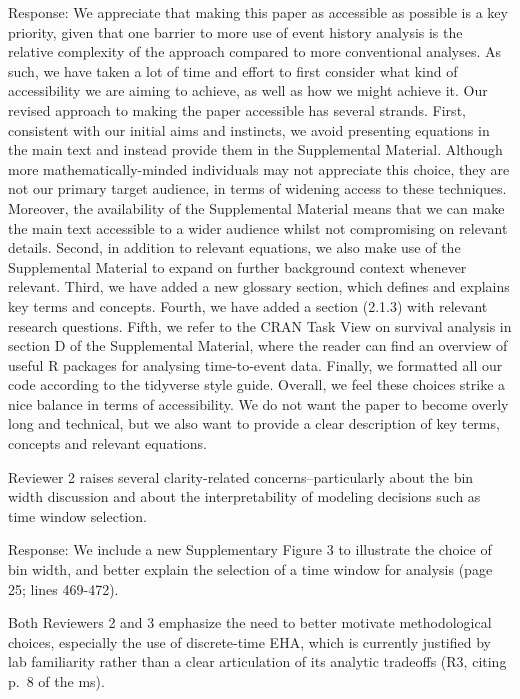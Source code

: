 \documentclass[
]{article}
\renewenvironment{quote}{\begin{leftbar}}{\end{leftbar}}
\begin{document}
Response: We appreciate that making this paper as accessible as possible
is a key priority, given that one barrier to more use of event history
analysis is the relative complexity of the approach compared to more
conventional analyses. As such, we have taken a lot of time and effort
to first consider what kind of accessibility we are aiming to achieve,
as well as how we might achieve it. Our revised approach to making the
paper accessible has several strands. First, consistent with our initial
aims and instincts, we avoid presenting equations in the main text and
instead provide them in the Supplemental Material. Although more
mathematically-minded individuals may not appreciate this choice, they
are not our primary target audience, in terms of widening access to
these techniques. Moreover, the availability of the Supplemental
Material means that we can make the main text accessible to a wider
audience whilst not compromising on relevant details. Second, in
addition to relevant equations, we also make use of the Supplemental
Material to expand on further background context whenever relevant.
Third, we have added a new glossary section, which defines and explains
key terms and concepts. Fourth, we have added a section (2.1.3) with
relevant research questions. Fifth, we refer to the CRAN Task View on
survival analysis in section D of the Supplemental Material, where the
reader can find an overview of useful R packages for analysing
time-to-event data. Finally, we formatted all our code according to the
tidyverse style guide. Overall, we feel these choices strike a nice
balance in terms of accessibility. We do not want the paper to become
overly long and technical, but we also want to provide a clear
description of key terms, concepts and relevant equations.

\begin{quote}
Reviewer 2 raises several clarity-related concerns--particularly about
the bin width discussion and about the interpretability of modeling
decisions such as time window selection.
\end{quote}

Response: We include a new Supplementary Figure 3 to illustrate the
choice of bin width, and better explain the selection of a time window
for analysis (page 25; lines 469-472).

\begin{quote}
Both Reviewers 2 and 3 emphasize the need to better motivate
methodological choices, especially the use of discrete-time EHA, which
is currently justified by lab familiarity rather than a clear
articulation of its analytic tradeoffs (R3, citing p.~8 of the ms).
\end{quote}
\end{document}
